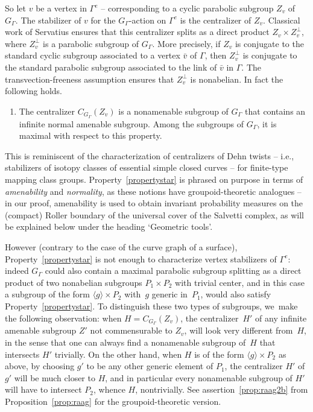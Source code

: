 \documentclass[11pt]{article}
\newcommand{\ie}{i.e.,\xspace}
\numberwithin{equation}{section}
\theoremstyle{plain}
\theoremstyle{definition}
\begin{document}
So let $v$ be a vertex in $\Gamma^e$ -- corresponding to a cyclic parabolic subgroup $Z_v$ of~$G_\Gamma$. The stabilizer of $v$ for the $G_\Gamma$-action on $\Gamma^e$ is the centralizer of $Z_v$. Classical work of Servatius \cite{Ser} ensures that this centralizer splits as a direct product $Z_v\times Z_v^{\perp}$, where $Z_v^{\perp}$ is a parabolic subgroup of $G_\Gamma$. More precisely, if $Z_v$ is conjugate to the standard cyclic subgroup associated to a vertex $\bar v$ of $\Gamma$, then $Z_v^{\perp}$ is conjugate to the standard parabolic subgroup associated to the link of $\bar v$ in $\Gamma$. The transvection-freeness assumption ensures that $Z_v^{\perp}$ is nonabelian. In fact the following holds.
\begin{enumerate}\renewcommand{\theenumi}{$*$}
\item\label{propertystar}
The centralizer $C_{G_\Gamma}(Z_v)$ is a nonamenable subgroup of $G_\Gamma$ that contains an infinite normal amenable subgroup. Among the subgroups of $G_\Gamma$, it is maximal with respect to this property.
\end{enumerate}
This is reminiscent of the characterization of centralizers of Dehn twists -- \ie stabilizers of isotopy classes of essential simple closed curves -- for finite-type mapping class groups. Property~\eqref{propertystar} is phrased on purpose in terms of \emph{amenability} and \emph{normality}, as these notions have groupoid-theoretic analogues -- in our proof, amenability is used to obtain invariant probability measures on the (compact) Roller boundary of the universal cover of the Salvetti complex, as will be explained below under the heading `Geometric tools'.\enlargethispage{.5\baselineskip}%

However (contrary to the case of the curve graph of a surface), Property~\eqref{propertystar} is not enough to characterize vertex stabilizers of $\Gamma^e$: indeed $G_\Gamma$ could also contain a maximal parabolic subgroup splitting as a direct product of two nonabelian subgroups $P_1\times P_2$ with trivial center, and in this case a subgroup of the form $\langle g\rangle \times P_2$ with~$g$ generic in~$P_1$, would also satisfy Property~\eqref{propertystar}. To distinguish these two types of subgroups, we~make the following observation: when $H=C_{G_\Gamma}(Z_v)$, the centralizer~$H'$ of any infinite amenable subgroup $Z'$ not commensurable to $Z_v$, will look very different from~$H$, in the sense that one can always find a nonamenable subgroup of~$H$ that intersects $H'$ trivially. On the other hand, when $H$ is of the form $\langle g\rangle \times P_2$ as above, by choosing $g'$ to be any other generic element of $P_1$, the centralizer $H'$ of $g'$ will be much closer to $H$, and in particular every nonamenable subgroup of $H'$ will have to intersect $P_2$, whence $H$, nontrivially. See assertion~\eqref{prop:raag2b} from Proposition~\ref{prop:raag} for the groupoid-theoretic version.
\end{document}
